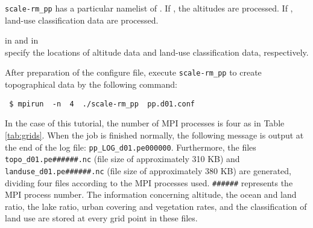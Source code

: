 \verb|scale-rm_pp| has a particular namelist of .
If , the altitudes are processed.
If , land-use classification data are processed.

 in 
and  in\\  specify the locations of altitude data and land-use classification data, respectively.

After preparation of the configure file,
execute \verb|scale-rm_pp| to create topographical data by the following command:
\begin{verbatim}
 $ mpirun  -n  4  ./scale-rm_pp  pp.d01.conf
\end{verbatim}
In the case of this tutorial, the number of MPI processes is four as in Table \ref{tab:grids}.
When the job is finished normally,
the following message is output at the end of the log file: \verb|pp_LOG_d01.pe000000|.
Furthermore, the files \verb|topo_d01.pe######.nc| (file size of approximately 310 KB)  and\\
\verb|landuse_d01.pe######.nc| (file size of approximately 380 KB)  are generated,
dividing four files according to the MPI processes used.
\verb|######| represents the MPI process number.
The information concerning altitude, the ocean and land ratio, the lake ratio, urban covering and vegetation rates, and the classification of land use are stored at every grid point in these files.


